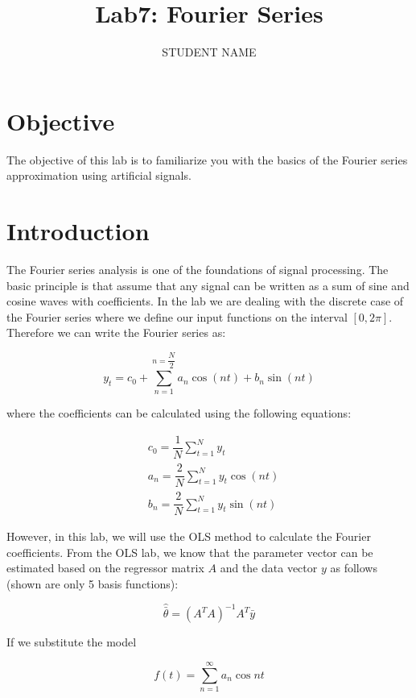 \documentclass[11pt,letterpaper]{article}
\author{STUDENT NAME}
\title{Lab7: Fourier Series}
\begin{document}
\maketitle
 
\section{Objective}
The objective of this lab is to familiarize you with the basics of the Fourier series approximation using artificial signals.

\section{Introduction}

The Fourier series analysis is one of the foundations of signal processing. The basic principle is that assume that any signal can be written as a sum of sine and cosine waves with coefficients. In the lab we are dealing with the discrete case of the Fourier series where we define our input functions on the interval $[0, 2 \pi]$. Therefore we can write the Fourier series as:

\begin{equation}\label{Lab7_FourierSeries1}
y_t = c_0 + \sum_{n=1}^{n = \dfrac{N}{2}} a_n \cos\left( n t \right) + b_n \sin\left( n t \right)
\end{equation}

where the coefficients can be calculated using the following equations:

\begin{align}\label{Lab7_FourierSeries2}
&c_0 = \dfrac{1}{N} \sum_{t=1}^{N}y_t\\
&a_n = \dfrac{2}{N} \sum_{t=1}^{N}y_t \cos(nt)\\
&b_n = \dfrac{2}{N} \sum_{t=1}^{N}y_t \sin(nt)
\end{align}

However, in this lab, we will use the OLS method to calculate the Fourier coefficients. From the OLS lab, we know that the parameter vector can be estimated based on the regressor matrix $A$ and the data vector $y$ as follows (shown are only 5 basis functions):

\begin{equation} \label{Lab7_FourierSeries3}
\hat{\bar{\theta}} = \left(A^T A \right)^{-1} A ^T \bar{y}  
\end{equation}

If we substitute the model

\begin{equation}\label{Lab7_FourierSeries4}
f(t) = \sum\limits_{n=1}^{\infty} a_n \cos nt 
\end{equation}
\end{document}
